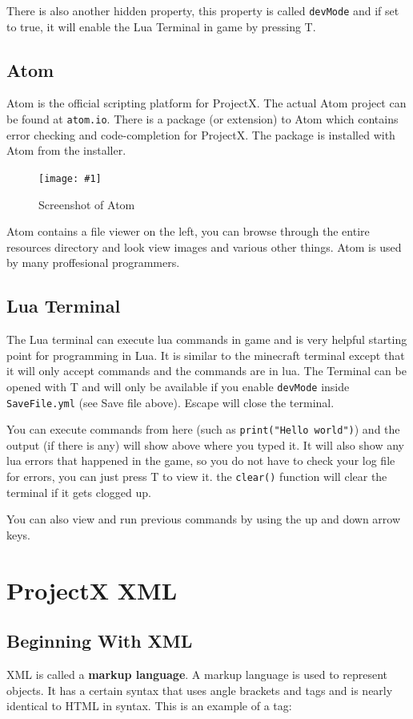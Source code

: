 \documentclass{book}
\newcommand{\fFigure}[2]
	{\begin{figure}[ht!]
		\centering
		\texttt{[image: \#1]}
		\caption{#2}
	\end{figure}}
\begin{document}
	There is also another hidden property, this property is called \texttt{devMode} and if set to true, it will enable the Lua Terminal in game by pressing T.
	\section{Atom}
	Atom is the official scripting platform for ProjectX. The actual Atom project can be found at \texttt{atom.io}. There is a package (or extension) to Atom which contains error checking and code-completion for ProjectX. The package is installed with Atom from the installer.
	
	\fFigure{Atom.png}{Screenshot of Atom}

	Atom contains a file viewer on the left, you can browse through the entire resources directory and look view images and various other things. Atom is used by many proffesional programmers.

	\section{Lua Terminal}
	The Lua terminal can execute lua commands in game and is very helpful starting point for programming in Lua. It is similar to the minecraft terminal except that it will only accept commands and the commands are in lua. The Terminal can be opened with T and will only be available if you enable \texttt{devMode} inside \texttt{SaveFile.yml} (see Save file above). Escape will close the terminal.

	You can execute commands from here (such as \texttt{print("Hello world")}) and the output (if there is any) will show above where you typed it. It will also show any lua errors that happened in the game, so you do not have to check your log file for errors, you can just press T to view it. the \texttt{clear()} function will clear the terminal if it gets clogged up.
	
	You can also view and run previous commands by using the up and down arrow keys.

	\chapter{ProjectX XML}
	\section{Beginning With XML}
	XML is called a \textbf{markup language}. A markup language is used to represent objects. It has a certain syntax that uses angle brackets and tags and is nearly identical to HTML in syntax. This is an example of a tag:
	
\end{document}
